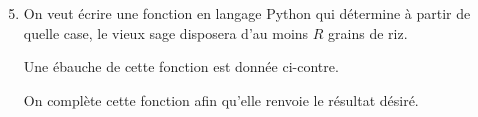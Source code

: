 \begin{multicols}{2}
\begin{enumerate}
\setcounter{enumi}{4}
\item  On veut écrire une fonction en langage Python qui détermine à partir de quelle case, le vieux sage disposera d'au moins $R$ grains de riz. 

Une ébauche de cette fonction est donnée ci-contre.

On complète cette fonction afin qu'elle renvoie le résultat désiré.
\end{enumerate}

\columnbreak

\begin{center}
\end{center}
\end{multicols}


